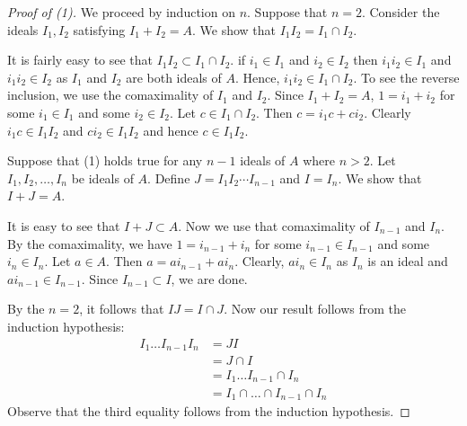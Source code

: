 \begin{proof}[Proof of (1)]
    We proceed by induction on $n$. Suppose that $n=2$. Consider the ideals $I_1 , I_2$ satisfying $I_1 + I_2 = A$. We show that $I_1 I_2 = I_1 \cap I_2$.

    It is fairly easy to see that $I_1 I_2 \subset I_1 \cap I_2$. if $i_1 \in I_1$ and $i_2 \in I_2$ then $i_1 i_2 \in I_1$ and $i_1 i_2 \in I_2$ as $I_1$ and $I_2$ are both ideals of $A$. Hence, $i_1 i_2 \in I_1 \cap I_2$. To see the reverse inclusion, we use the comaximality of $I_1$ and $I_2$. Since $I_1 + I_2 =A$, $1=i_1 + i_2$ for some $i_1 \in I_1$ and some $i_2 \in I_2$. Let $c \in I_1 \cap I_2$. Then $c= i_1 c + c i_2 $. Clearly $i_1 c \in I_1 I_2$ and $c i_2 \in I_1 I_2$ and hence $c\in I_1 I_2$.

    Suppose that (1) holds true for any $n-1$ ideals of $A$ where $n>2$. Let $I_1 , I_2 , \ldots , I_n$ be ideals of $A$. Define $J=I_1 I_2 \cdots I_{n-1}$ and $I= I_n$. We show that $I+J=A$.

    It is easy to see that $I+J \subset A$. Now we use that comaximality of $I_{n-1}$ and $I_n$. By the comaximality, we have $1 = i_{n-1} + i_{n}$ for some $i_{n-1}\in I_{n-1}$ and some $i_n \in I_{n}$. Let $a\in A$. Then $a=ai_{n-1} + ai_{n}$. Clearly, $ai_{n} \in I_{n}$ as $I_{n}$ is an ideal and $ai_{n-1} \in I_{n-1}$. Since $I_{n-1}\subset I$, we are done.

    By the $n=2$, it follows that $IJ=I\cap J$. Now our result follows from the induction hypothesis:
    \begin{align*}
	I_1 \ldots I_{n-1} I_n &= JI \\
	                       &= J \cap I \\
			       &= I_1 \ldots I_{n-1} \cap I_n \\
			       &= I_1 \cap \ldots \cap I_{n-1} \cap I_n
    \end{align*}
    Observe that the third equality follows from the induction hypothesis.
    
\end{proof}

